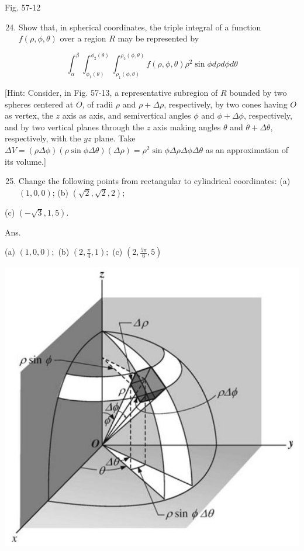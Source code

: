 \documentclass[10pt]{article}
\begin{document}
Fig. 57-12

\begin{enumerate}
  \setcounter{enumi}{23}
  \item Show that, in spherical coordinates, the triple integral of a function $f(\rho, \phi, \theta)$ over a region $R$ may be represented by
\end{enumerate}

$$
\int_{\alpha}^{\beta} \int_{\phi_{1}(\theta)}^{\phi_{2}(\theta)} \int_{\rho_{1}(\phi, \theta)}^{\rho_{2}(\phi, \theta)} f(\rho, \phi, \theta) \rho^{2} \sin \phi d \rho d \phi d \theta
$$

[Hint: Consider, in Fig. 57-13, a representative subregion of $R$ bounded by two spheres centered at $O$, of radii $\rho$ and $\rho+\Delta \rho$, respectively, by two cones having $O$ as vertex, the $z$ axis as axis, and semivertical angles $\phi$ and $\phi+\Delta \phi$, respectively, and by two vertical planes through the $z$ axis making angles $\theta$ and $\theta+\Delta \theta$, respectively, with the $y z$ plane. Take $\Delta V=(\rho \Delta \phi)(\rho \sin \phi \Delta \theta)(\Delta \rho)=\rho^{2} \sin \phi \Delta \rho \Delta \phi \Delta \theta$ as an approximation of its volume.]

\begin{enumerate}
  \setcounter{enumi}{24}
  \item Change the following points from rectangular to cylindrical coordinates: (a) $(1,0,0)$; (b) $(\sqrt{2}, \sqrt{2}, 2)$;
\end{enumerate}

(c) $(-\sqrt{3}, 1,5)$.

Ans.

(a) $(1,0,0) ;$ (b) $\left(2, \frac{\pi}{4}, 1\right) ;$ (c) $\left(2, \frac{5 \pi}{6}, 5\right)$

\begin{center}
\includegraphics[max width=\textwidth]{2024_04_20_fe2e8e718cc0fcd63d1bg-11}
\end{center}
\end{document}
